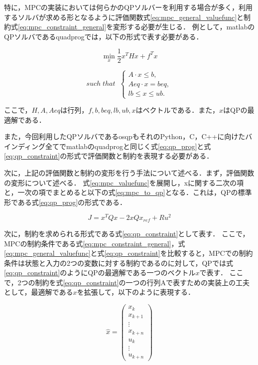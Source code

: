 特に，MPCの実装においては何らかのQPソルバーを利用する場合が多く，利用するソルバが求める形となるように評価関数式\eqref{eq:mpc_general_valuefunc}と制約式\eqref{eq:mpc_constraint_general}を変形する必要が生じる．
例として，matlab\cite{MATLAB:2021}のQPソルバであるquadprog\cite{MATLABQUADPLOG}では，以下の形式で表す必要がある．

\begin{equation}
  \underset{x}{\min} \frac{1}{2}x^THx + f^Tx
  \label{eq:qp_prog}
\end{equation}

\begin{equation}
  such \; that \;\;
  \begin{cases}
    A \cdot x \leq b,  \\
    Aeq \cdot x = beq, \\
    lb \leq x \leq ub.
  \end{cases}
  \label{eq:qp_constraint}
\end{equation}

ここで，$H,A,Aeq$は行列，$f,b,beq,lb,ub,x$はベクトルである．また，$x$はQPの最適解である．

また，今回利用したQPソルバであるosqp\cite{OSQP}もそれのPython，C，C++に向けたバインディング全てでmatlabのquadprogと同じく式\eqref{eq:qp_prog}と式\eqref{eq:qp_constraint}の形式で評価関数と制約を表現する必要がある．

次に，上記の評価関数と制約の変形を行う手法について述べる．まず，評価関数の変形について述べる．
式\eqref{eq:mpc_valuefunc}を展開し，xに関する二次の項と，一次の項でまとめると以下の式\eqref{eq:mpc_to_qp}となる．これは，QPの標準形である式\eqref{eq:qp_prog}の形式である．

\begin{equation}
  J =  x^TQx - 2xQx_{ref} + Ru^2
  \label{eq:mpc_to_qp}
\end{equation}

次に，制約を求められる形式である式\eqref{eq:qp_constraint}として表す．
ここで，MPCの制約条件である式\eqref{eq:mpc_constraint_general}，式\eqref{eq:mpc_general_valuefunc}と式\eqref{eq:qp_constraint}を比較すると，MPCでの制約条件は状態と入力の2つの変数に対する制約であるのに対して，QPでは式\eqref{eq:qp_constraint}のようにQPの最適解である一つのベクトル$x$で表す．
ここで，2つの制約を式\eqref{eq:qp_constraint}の一つの行列Aで表すための実装上の工夫として，最適解である$x$を拡張して，以下のように表現する．

\begin{equation}
  \hat{x} =
  \begin{pmatrix}
    x_{k} \\ x_{k+1} \\ \vdots \\ x_{k+n}
    \\
    u_{k} \\ \vdots \\ u_{k+n}
  \end{pmatrix}
  \label{eq:augment_vec}
\end{equation}

